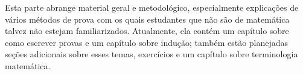 \documentclass[../../include/open-logic-part]{subfiles}
\begin{document}

\begin{editorial}
  Esta parte abrange material geral e metodológico, especialmente
  explicações de vários métodos de prova com os quais estudantes que não são de matemática talvez
  não estejam familiarizados. Atualmente, ela contém um capítulo sobre como escrever
  provas e um capítulo sobre indução; também estão planejadas seções adicionais
  sobre esses temas, exercícios e um capítulo sobre terminologia
  matemática.
\end{editorial}



\OLEndPartHook
\end{document}

